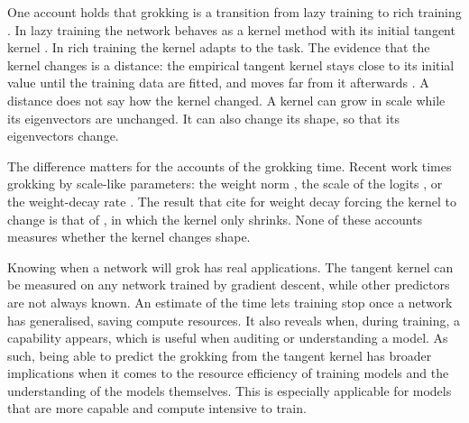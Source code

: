 \documentclass[a4paper,11pt]{article} %
\begin{document}

One account holds that grokking is a transition from lazy training to rich
training \citep{kumarGrokkingTransitionLazy2024}. In lazy training the network
behaves as a kernel method with its initial tangent kernel
\citep{chizatLazyTrainingDifferentiable2020}. In rich training the
kernel adapts to the task. The evidence that the kernel changes is a distance:
the empirical tangent kernel stays close to its initial value until the training
data are fitted, and moves far from it afterwards
\citep{mohamadiWhyYouGrok2024}. A distance does not say how the kernel changed.
A kernel can grow in scale while its eigenvectors are unchanged. It can also
change its shape, so that its eigenvectors change.

The difference matters for the accounts of the grokking time. Recent work times
grokking by scale-like parameters: the weight norm
\citep{khanhWeightNormSets2026}, the scale of the
logits \citep{khanhWhatDoesWeight2026}, or the weight-decay rate
\citep{kimGrokkingWeightDecayClock2026,pracherSpectralTheoryGrokking2026}. The
result that \citet{kumarGrokkingTransitionLazy2024} cite for weight
decay forcing
the kernel to change is that of \citet{lewkowyczTrainingDynamicsDeep2021}, in
which the kernel only shrinks. None of these accounts measures whether the
kernel changes shape.

Knowing when a network will grok has real applications. The tangent
kernel can be measured on any network trained by gradient descent, while other predictors are not always known. An estimate of the
time lets training stop once a network has generalised, saving compute resources.
It also reveals when, during training, a capability appears, which is useful when auditing or understanding a model. As such, being able to predict the grokking from the tangent kernel has broader implications when it comes to the resource efficiency of training models and the understanding of the models themselves. This is especially applicable for models that are more capable and compute intensive to train. 
\end{document}
